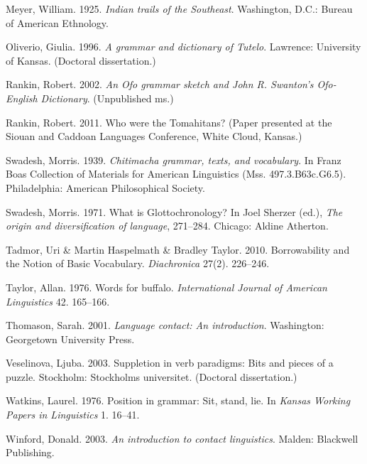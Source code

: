 \documentclass[output=paper]{LSP/langsci}
\begin{document}
\begin{reflist}
Meyer, William. 1925. \emph{Indian trails of the Southeast}. Washington, D.C.: Bureau of American Ethnology.

Oliverio, Giulia. 1996. \emph{A grammar and dictionary of Tutelo}. Lawrence: University of Kansas. (Doctoral dissertation.)

Rankin, Robert. 2002. \emph{An Ofo grammar sketch and John R. Swanton’s Ofo-English Dictionary}. (Unpublished ms.)

Rankin, Robert. 2011. Who were the Tomahitans? (Paper presented at the Siouan and Caddoan Languages Conference, White Cloud, Kansas.)

Swadesh, Morris. 1939. \emph{Chitimacha grammar, texts, and vocabulary}. In Franz Boas Collection of Materials for American Linguistics (Mss. 497.3.B63c.G6.5). Philadelphia: American Philosophical Society.

Swadesh, Morris. 1971. What is Glottochronology? In Joel Sherzer (ed.), \emph{The origin and diversification of language}, 271--284. Chicago: Aldine Atherton.

Tadmor, Uri \& Martin Haspelmath \& Bradley Taylor. 2010. Borrowability and the Notion of Basic Vocabulary. \emph{Diachronica} 27(2). 226--246.

Taylor, Allan. 1976. Words for buffalo. \emph{International Journal of American Linguistics} 42. 165--166.

Thomason, Sarah. 2001. \emph{Language contact: An introduction}. Washington: Georgetown University Press.

Veselinova, Ljuba. 2003. Suppletion in verb paradigms: Bits and pieces of a puzzle. Stockholm: Stockholms universitet. (Doctoral dissertation.)

Watkins, Laurel. 1976. Position in grammar: Sit, stand, lie. In \emph{Kansas Working Papers in Linguistics} 1. 16--41.

Winford, Donald. 2003. \emph{An introduction to contact linguistics}. Malden: Blackwell Publishing.

\end{reflist}
\end{document}
